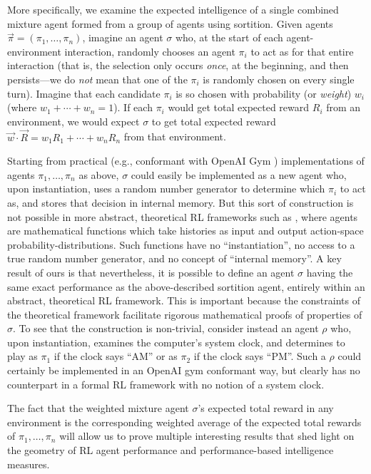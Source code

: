 \documentclass[twoside]{article}
\begin{document}
More specifically, we examine the expected intelligence of a single combined
mixture agent formed from a group of agents using sortition.
Given agents $\vec{\pi}=(\pi_1,\ldots,\pi_n)$,
imagine an agent $\sigma$
who, at the start of each agent-environment interaction, randomly chooses
an agent $\pi_i$ to act as for that entire interaction (that is, the selection
only occurs \emph{once}, at the beginning, and then persists---we do \emph{not}
mean that one of the $\pi_i$ is randomly chosen on every single turn).
Imagine that each candidate $\pi_i$ is so chosen with probability (or \emph{weight})
$w_i$ (where $w_1+\cdots+w_n=1$). If each $\pi_i$ would get total expected
reward $R_i$ from an environment,
we would expect $\sigma$ to get total expected reward
$\vec{w}\cdot \vec{R}=w_1R_1+\cdots+w_nR_n$ from that environment.

Starting from practical (e.g., conformant with OpenAI Gym \cite{brockman2016openai})
implementations of agents $\pi_1,\ldots,\pi_n$ as above, $\sigma$ could easily be
implemented as a new agent who, upon instantiation, uses a random number generator
to determine which $\pi_i$ to act as, and stores that decision in internal memory.
But this sort of construction is not possible in more abstract, theoretical
RL frameworks such as \cite{legg2007universal, DBLP:conf/ijcai/LeggH05}, where agents are mathematical functions
which take histories as input and output action-space probability-distributions.
Such functions have no ``instantiation'', no access to a true random number
generator, and no concept of ``internal memory''. A key result of ours is that
nevertheless, it is possible to define an agent $\sigma$ having the same exact performance
as the above-described sortition agent, entirely within an abstract, theoretical
RL framework. This is important because the constraints of the theoretical framework
facilitate rigorous mathematical proofs of properties of $\sigma$. To see that the
construction
is non-trivial, consider instead an agent $\rho$ who, upon instantiation, examines the
computer's system clock, and determines to play as $\pi_1$ if the clock says ``AM'' or as
$\pi_2$ if the clock says ``PM''. Such a $\rho$ could certainly be implemented in an
OpenAI gym conformant way, but clearly has no counterpart in a formal RL framework
with no notion of a system clock.

The fact that the weighted mixture agent $\sigma$'s expected total reward in any
environment is the corresponding weighted average of the expected total rewards of
$\pi_1,\ldots,\pi_n$ will allow us to prove multiple interesting results that
shed light on the geometry of RL agent performance and performance-based intelligence
measures.
\end{document}
